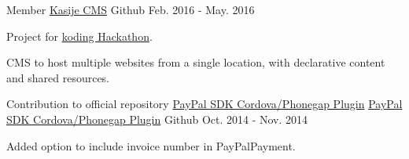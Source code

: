 \begin{cventries}
  \cventry
    {Member} %
    {\href{https://github.com/touwolf/kasije}{Kasije CMS}} %
    {\faGithubSquare\acvHeaderIconSep Github} %
    {Feb. 2016 - May. 2016} %
    {
      \begin{cvitems} %
        \item {Project for \href{https://www.koding.com/Hackathon}{koding Hackathon}.}
        \item {CMS to host multiple websites from a single location, with declarative content and shared resources.}
      \end{cvitems}
    }

  \cventry
    {Contribution to official repository \href{https://github.com/paypal/PayPal-Cordova-Plugin}{PayPal SDK Cordova/Phonegap Plugin}} %
    {\faPaypal \hphantom{-} \href{https://github.com/zp1ke/PayPal-Cordova-Plugin}{PayPal SDK Cordova/Phonegap Plugin}} %
    {\faGithubSquare\acvHeaderIconSep Github} %
    {Oct. 2014 - Nov. 2014} %
    {
      \begin{cvitems} %
        \item {Added option to include invoice number in PayPalPayment.}
      \end{cvitems}
    }

\end{cventries}
